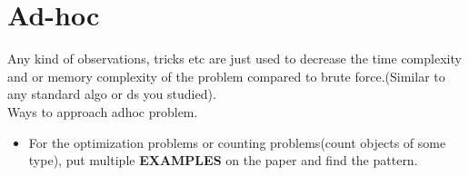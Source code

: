 \documentclass[../Notes.tex]{subfiles}
\begin{document}
\chapter{Ad-hoc}
Any kind of observations, tricks etc are just used to decrease the time complexity and or memory complexity of the problem compared to brute force.(Similar to any standard  algo or ds you studied).\\

Ways to approach adhoc problem.
\begin{itemize}
	\item For the optimization problems or counting problems(count objects of some type), put multiple \textbf{EXAMPLES} on the paper and find the pattern.
\end{itemize}
\end{document}
